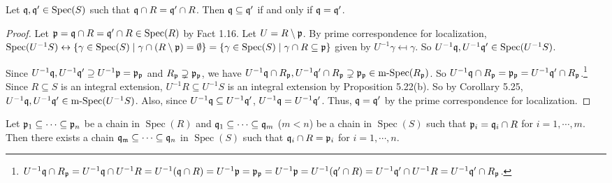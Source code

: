\begin{proposition}
    Let $\mathfrak{q},\mathfrak{q}' \in \operatorname{Spec}(S)$ such that $\mathfrak{q} \cap R = \mathfrak{q}' \cap R$. Then $\mathfrak{q} \subseteq \mathfrak{q}'$ if and only if $\mathfrak{q} = \mathfrak{q}'$.
\end{proposition}

\begin{proof}
    Let $\mathfrak{p} = \mathfrak{q} \cap R = \mathfrak{q}' \cap R \in \operatorname{Spec}(R)$ by Fact 1.16. Let $U = R \setminus \mathfrak{p}$. By prime correspondence for localization, $\operatorname{Spec}(U^{-1}S) \leftrightarrow \{\gamma \in \operatorname{Spec}(S) \mid \gamma \cap (R\setminus \mathfrak{p}) = \emptyset\} = \{\gamma \in \operatorname{Spec}(S) \mid \gamma \cap R \subseteq \mathfrak{p}\}$ given by $U^{-1}\gamma \mapsfrom \gamma$. So $U^{-1}\mathfrak{q},U^{-1}\mathfrak{q}' \in \operatorname{Spec}(U^{-1}S)$. 
    \begin{center}
    \end{center}
    Since $U^{-1}\mathfrak{q}, U^{-1}\mathfrak{q}' \supseteq U^{-1}\mathfrak{p} = \mathfrak{p}_{\mathfrak{p}}$ and $R_{\mathfrak{p}} \supsetneq \mathfrak{p}_{\mathfrak{p}}$, we have $U^{-1}\mathfrak{q} \cap R_{\mathfrak{p}}, U^{-1}\mathfrak{q}' \cap R_{\mathfrak{p}} \supsetneq \mathfrak{p}_{\mathfrak{p}} \in \operatorname{m-Spec}(R_{\mathfrak{p}})$. So $U^{-1}\mathfrak{q} \cap R_{\mathfrak{p}} = \mathfrak{p}_{\mathfrak{p}} = U^{-1}\mathfrak{q}' \cap R_{\mathfrak{p}}$.\footnote[2]{$U^{-1}\mathfrak{q} \cap R_{\mathfrak{p}} = U^{-1}\mathfrak{q} \cap U^{-1}R = U^{-1}(\mathfrak{q} \cap R) = U^{-1}\mathfrak{p} = \mathfrak{p}_{\mathfrak{p}} = U^{-1}\mathfrak{p} = U^{-1}(\mathfrak{q}' \cap R) = U^{-1}\mathfrak{q}' \cap U^{-1}R = U^{-1}\mathfrak{q}' \cap R_{\mathfrak{p}}$.} Since $R \subseteq S$ is an integral extension, $U^{-1}R \subseteq U^{-1}S$ is an integral extension by Proposition 5.22(b). So by Corollary 5.25, $U^{-1}\mathfrak{q},U^{-1}\mathfrak{q}' \in \operatorname{m-Spec}(U^{-1}S)$. Also, since $U^{-1}\mathfrak{q} \subseteq U^{-1}\mathfrak{q}'$, $U^{-1}\mathfrak{q} = U^{-1}\mathfrak{q}'$. Thus, $\mathfrak{q} = \mathfrak{q}'$ by the prime correspondence for localization.
\end{proof}

\begin{theorem}
    Let $\mathfrak{p}_1 \subseteq \cdots \subseteq \mathfrak{p}_n$ be a chain in $\operatorname{Spec}(R)$ and $\mathfrak{q}_1 \subseteq \cdots \subseteq \mathfrak{q}_m$ ($m < n$) be a chain in $\operatorname{Spec}(S)$ such that $\mathfrak{p}_i = \mathfrak{q}_i \cap R$ for $i = 1,\cdots,m$. Then there exists a chain $\mathfrak{q}_{\mathfrak{m}} \subseteq \cdots \subseteq \mathfrak{q}_n$ in $\operatorname{Spec}(S)$ such that $\mathfrak{q}_i \cap R = \mathfrak{p}_i$ for $i = 1,\cdots,n$.
\end{theorem}

